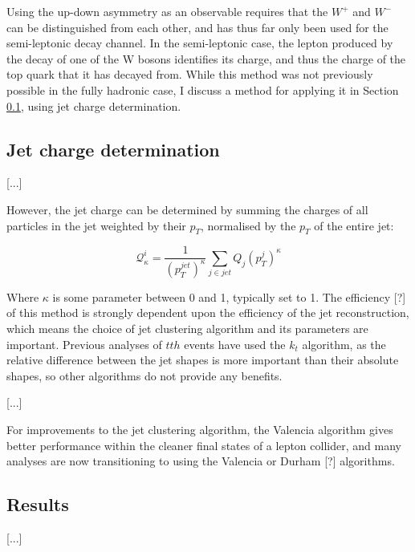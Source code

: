 Using the up-down asymmetry as an observable requires that the $W^+$ and $W^-$ can be distinguished from each other, and has thus far only been used for the semi-leptonic decay channel. In the semi-leptonic case, the lepton produced by the decay of one of the W bosons identifies its charge, and thus the charge of the top quark that it has decayed from. While this method was not previously possible in the fully hadronic case, I discuss a method for applying it in Section \ref{physics/CP/jetcharge}, using jet charge determination.

\subsection{Jet charge determination} \label{physics/CP/jetcharge}
[...]

However, the jet charge can be determined by summing the charges of all particles in the jet weighted by their $p_T$, normalised by the $p_T$ of the entire jet:
		
\begin{displaymath}
	\mathcal{Q}_\kappa^i = \frac{1}{(p_T^{jet})^\kappa} \sum_{j \in jet} Q_j (p_T^j)^\kappa
\end{displaymath}

Where $\kappa$ is some parameter between 0 and 1, typically set to 1. The efficiency [?] of this method is strongly dependent upon the efficiency of the jet reconstruction, which means the choice of jet clustering algorithm and its parameters are important. Previous analyses of $tth$ events have used the $k_t$ algorithm, as the relative difference between the jet shapes is more important than their absolute shapes, so other algorithms do not provide any benefits.

[...]

For improvements to the jet clustering algorithm, the Valencia algorithm gives better performance within the cleaner final states of a lepton collider, and many analyses are now transitioning to using the Valencia or Durham [?] algorithms.

\subsection{Results}
[...]
